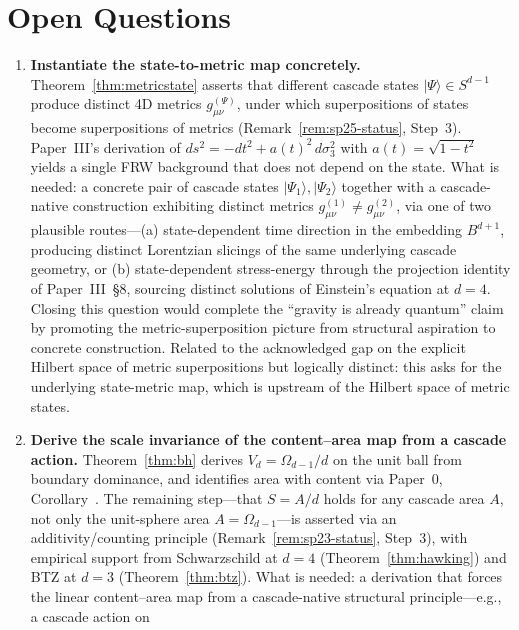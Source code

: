 \documentclass[12pt,a4paper]{article}
\begin{document}
\section{Open Questions}\label{sec:open-questions-part2eq3}

\begin{enumerate}
\item\label{oq:state-metric-instantiation} \textbf{Instantiate the
state-to-metric map concretely.} Theorem~\ref{thm:metricstate} asserts
that different cascade states $|\Psi\rangle \in S^{d-1}$ produce
distinct 4D metrics $g_{\mu\nu}^{(\Psi)}$, under which superpositions
of states become superpositions of metrics
(Remark~\ref{rem:sp25-status}, Step~3). Paper~III's derivation of
$ds^2 = -dt^2 + a(t)^2\,d\sigma_3^2$ with $a(t) = \sqrt{1-t^2}$ yields
a single FRW background that does not depend on the state. What is
needed: a concrete pair of cascade states $|\Psi_1\rangle,
|\Psi_2\rangle$ together with a cascade-native construction exhibiting
distinct metrics $g^{(1)}_{\mu\nu} \neq g^{(2)}_{\mu\nu}$, via one of
two plausible routes---(a) state-dependent time direction in the
embedding $B^{d+1}$, producing distinct Lorentzian slicings of the
same underlying cascade geometry, or (b) state-dependent stress-energy
through the projection identity of Paper~III~\S8, sourcing distinct
solutions of Einstein's equation at $d=4$. Closing this question would
complete the ``gravity is already quantum'' claim by promoting the
metric-superposition picture from structural aspiration to concrete
construction. Related to the acknowledged gap on the explicit Hilbert
space of metric superpositions but logically distinct: this asks for
the underlying state-metric map, which is upstream of the Hilbert
space of metric states.
\item\label{oq:content-area-scale-invariance} \textbf{Derive the
scale invariance of the content--area map from a cascade action.}
Theorem~\ref{thm:bh} derives $V_d = \Omega_{d-1}/d$ on the unit ball
from boundary dominance, and identifies area with content via Paper~0,
Corollary~. The remaining step---that $S = A/d$ holds for any cascade
area $A$, not only the unit-sphere area $A = \Omega_{d-1}$---is asserted
via an additivity/counting principle (Remark~\ref{rem:sp23-status},
Step~3), with empirical support from Schwarzschild at $d=4$
(Theorem~\ref{thm:hawking}) and BTZ at $d=3$ (Theorem~\ref{thm:btz}).
What is needed: a derivation that forces the linear content--area map
from a cascade-native structural principle---e.g., a cascade action on

\end{enumerate}
\end{document}
